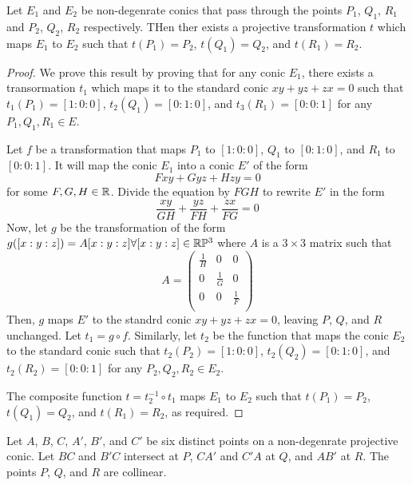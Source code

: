 \begin{prop}
  Let $E_1$ and $E_2$ be non-degenrate conics that pass through the points $P_1$, $Q_1$, $R_1$
  and $P_2$, $Q_2$, $R_2$ respectively. THen ther exists a projective transformation $t$ which
  maps $E_1$ to $E_2$ such that $t(P_1)=P_2$, $t(Q_1)=Q_2$, and $t(R_1)=R_2$.
\end{prop}

\begin{proof}
  We prove this result by proving that for any conic $E_1$, there exists a transormation $t_1$
  which maps it to the standard conic $xy+yz+zx=0$ such that $t_1(P_1)=[1:0:0]$,
  $t_2(Q_1)=[0:1:0]$, and $t_3(R_1)=[0:0:1]$ for any $P_1,Q_1,R_1\in E$.

  Let $f$ be a transformation that maps $P_1$ to $[1:0:0]$, $Q_1$ to $[0:1:0]$, and $R_1$ to
  $[0:0:1]$. It will map the conic $E_1$ into a conic $E'$ of the form
  \[
    Fxy+Gyz+Hzy=0
  \]
  for some $F,G,H\in\mathbb{R}$. Divide the equation by $FGH$ to rewrite $E'$ in the form
  \[
    \frac{xy}{GH}+\frac{yz}{FH}+\frac{zx}{FG}=0
  \]
  Now, let $g$ be the transformation of the form $g([x:y:z])=A[x:y:z]\forall[x:y:z]\in\mathbb{R}\mathbb{P}^3$
  where $A$ is a $3\times 3$ matrix such that
  \[
    A=
    \left(\begin{array}{ccc}
      \frac{1}{H} & 0           & 0           \\
      0           & \frac{1}{G} & 0           \\
      0           & 0           & \frac{1}{F} \\
    \end{array}\right)
  \]
  Then, $g$ maps $E'$ to the standrd conic $xy+yz+zx=0$, leaving $P$, $Q$, and $R$ unchanged.
  Let $t_1=g\circ f$. Similarly, let $t_2$ be the function that maps the conic $E_2$ to the
  standard conic such that $t_2(P_2)=[1:0:0]$, $t_2(Q_2)=[0:1:0]$, and $t_2(R_2)=[0:0:1]$
  for any $P_2,Q_2,R_2\in E_2$.

  The composite function $t=t_2^{-1}\circ t_1$ maps $E_1$ to $E_2$ such that $t(P_1)=P_2$,
  $t(Q_1)=Q_2$, and $t(R_1)=R_2$, as required.
\end{proof}

\begin{theorem}
  Let $A$, $B$, $C$, $A'$, $B'$, and $C'$ be six distinct points on a non-degenrate projective
  conic. Let $BC$ and $B'C$ intersect at $P$, $CA'$ and $C'A$ at $Q$, and $AB'$ at $R$. The
  points $P$, $Q$, and $R$ are collinear.
\end{theorem}

